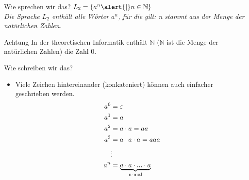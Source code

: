 \begin{frame}[fragile]{Wie sprechen wir das?}
$L_2 = \{a^n \alert{\mid} n \in \mathbb{N}\}$ \\

\emph{Die Sprache $L_2$ enthält alle Wörter $a^n$, \alert{für die gilt}: n stammt aus der Menge der natürlichen Zahlen.}
\vspace{5pt}

\begin{alertblock}{Achtung}
    In der theoretischen Informatik enthält $\mathbb{N}$ ($\mathbb{N}$ ist die Menge der natürlichen Zahlen) die Zahl 0.
\end{alertblock}

\end{frame}

\begin{frame}[fragile]{Wie schreiben wir das?}
    \begin{itemize}
        \item
        Viele Zeichen hintereinander (konkateniert) können auch einfacher geschrieben werden.
        \begin{align*}
            a^0 &= \varepsilon\\
            a^1 &= a\\
            a^2 &= a \cdot a = aa\\
            a^3 &= a \cdot a \cdot a = aaa\\
            &\vdots\\
            a^n &= \underbrace{a \cdot a \cdot ... \cdot a}_{\text{n-mal}}
        \end{align*}
        
        \end{itemize}
\end{frame}

